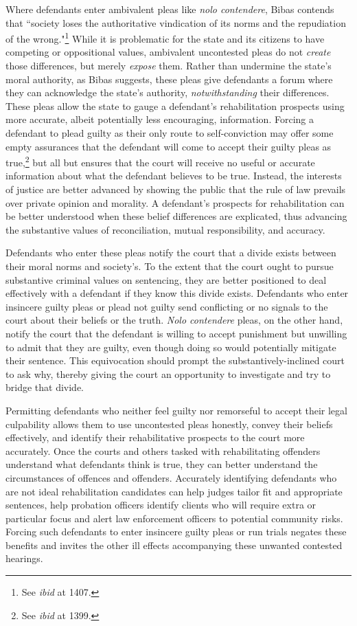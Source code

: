 Where defendants enter ambivalent pleas like \textit{nolo contendere}, Bibas contends that ``society loses the authoritative vindication of its norms and the repudiation of the wrong."\footnote{See \textit{ibid} at 1407.} While it is problematic for the state and its citizens to have competing or oppositional values, ambivalent uncontested pleas do not \textit{create} those differences, but merely \textit{expose} them. Rather than undermine the state's moral authority, as Bibas suggests, these pleas give defendants a forum where they can acknowledge the state's authority, \textit{notwithstanding} their differences. These pleas allow the state to gauge a defendant's rehabilitation prospects using more accurate, albeit potentially less encouraging, information. Forcing a defendant to plead guilty as their only route to self-conviction may offer some empty assurances that the defendant will come to accept their guilty pleas as true,\footnote{See \textit{ibid} at 1399.} but all but ensures that the court will receive no useful or accurate information about what the defendant believes to be true. Instead, the interests of justice are better advanced by showing the public that the rule of law prevails over private opinion and morality. A defendant's prospects for rehabilitation can be better understood when these belief differences are explicated, thus advancing the substantive values of reconciliation, mutual responsibility, and accuracy.

Defendants who enter these pleas notify the court that a divide exists between their moral norms and society's. To the extent that the court ought to pursue substantive criminal values on sentencing, they are better positioned to deal effectively with a defendant if they know this divide exists. Defendants who enter insincere guilty pleas or plead not guilty send conflicting or no signals to the court about their beliefs or the truth. \textit{Nolo contendere} pleas, on the other hand, notify the court that the defendant is willing to accept punishment but unwilling to admit that they are guilty, even though doing so would potentially mitigate their sentence. This equivocation should prompt the substantively-inclined court to ask why, thereby giving the court an opportunity to investigate and try to bridge that divide. 

Permitting defendants who neither feel guilty nor remorseful to accept their legal culpability allows them to use uncontested pleas honestly, convey their beliefs effectively, and identify their rehabilitative prospects to the court more accurately. Once the courts and others tasked with rehabilitating offenders understand what defendants think is true, they can better understand the circumstances of offences and offenders. Accurately identifying defendants who are not ideal rehabilitation candidates can help judges tailor fit and appropriate sentences, help probation officers identify clients who will require extra or particular focus and alert law enforcement officers to potential community risks. Forcing such defendants to enter insincere guilty pleas or run trials negates these benefits and invites the other ill effects accompanying these unwanted contested hearings.


